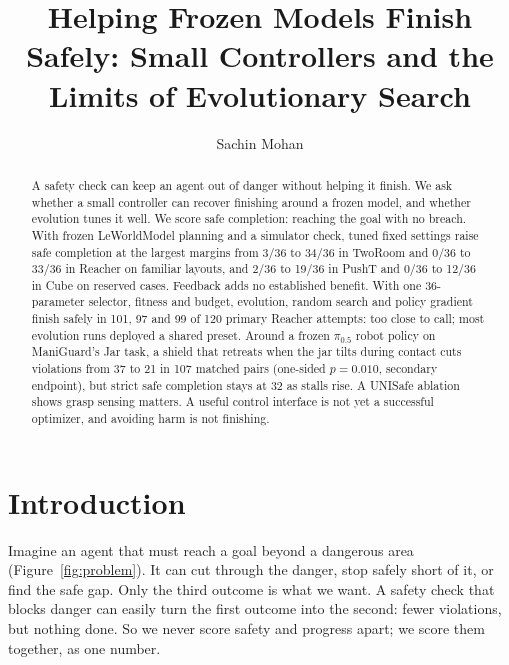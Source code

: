 \documentclass[sigconf,nonacm]{acmart}
\begin{document}
\raggedbottom
\title[Helping Frozen Models Finish Safely]{Helping Frozen Models Finish Safely: Small Controllers and the Limits of Evolutionary Search}
\author{Sachin Mohan}
\renewcommand{\shortauthors}{S. Mohan}
\begin{abstract}
A safety check can keep an agent out of danger without helping it finish.
We ask whether a small controller can recover finishing around a frozen
model, and whether evolution tunes it well. We score safe completion:
reaching the goal with no breach. With frozen LeWorldModel planning and a
simulator check, tuned fixed settings raise safe completion
at the largest margins from 3/36 to 34/36 in TwoRoom and 0/36 to 33/36 in
Reacher on familiar layouts, and 2/36 to 19/36 in PushT and 0/36 to 12/36
in Cube on reserved cases. Feedback adds no established benefit. With one
36-parameter selector, fitness and budget, evolution, random search
and policy gradient finish safely in 101, 97 and 99 of 120 primary Reacher
attempts: too close to call; most evolution runs deployed a shared preset. Around a frozen $\pi_{0.5}$ robot policy on ManiGuard's Jar task, a
shield that retreats when the jar tilts during contact cuts violations from
37 to 21 in 107 matched pairs (one-sided $p=0.010$, secondary endpoint), but
strict safe completion stays at 32 as stalls rise. A UNISafe ablation shows
grasp sensing matters. A useful control interface is not yet a
successful optimizer, and avoiding harm is not finishing.
\end{abstract}
\maketitle
\pagestyle{fancy}\fancyhf{}
\fancyfoot[C]{\thepage}\thispagestyle{fancy}

\section{Introduction}
Imagine an agent that must reach a goal beyond a dangerous area
(Figure~\ref{fig:problem}). It can cut through the danger, stop safely
short of it, or find the safe gap. Only the third outcome is what we want.
A safety check that blocks danger can easily turn the first outcome into the
second: fewer violations, but nothing done. So we never score safety and
progress apart; we score them together, as one number.
\end{document}
